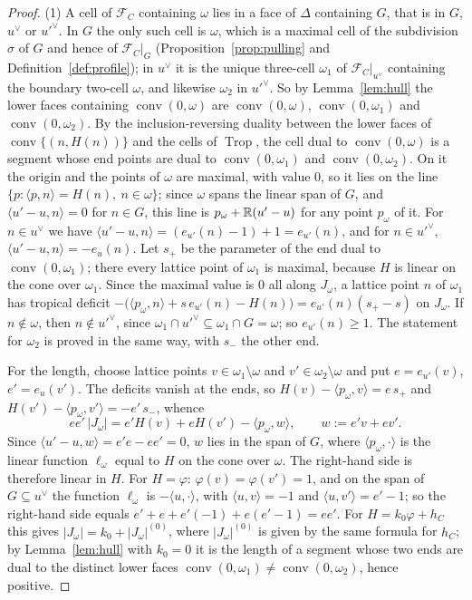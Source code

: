 \begin{proof}
(1) A cell of $\mathcal F_C$ containing $\omega$ lies in a face of $\Delta$ containing $G$, that is in $G$, $u^\vee$ or
$u'^\vee$. In $G$ the only such cell is $\omega$, which is a maximal cell of the subdivision $\sigma$ of $G$ and hence of
$\mathcal F_C|_G$ (Proposition~\ref{prop:pulling} and Definition~\ref{def:profile}); in $u^\vee$ it is the unique three-cell
$\omega_1$ of $\mathcal F_C|_{u^\vee}$ containing the boundary two-cell $\omega$, and likewise $\omega_2$ in $u'^\vee$. So by
Lemma~\ref{lem:hull} the lower faces containing $\operatorname{conv}(0,\omega)$ are $\operatorname{conv}(0,\omega)$,
$\operatorname{conv}(0,\omega_1)$ and $\operatorname{conv}(0,\omega_2)$. By the inclusion-reversing duality between the lower
faces of $\operatorname{conv}\{(n,H(n))\}$ and the cells of $\operatorname{Trop}$, the cell dual to $\operatorname{conv}(0,\omega)$
is a segment whose end points are dual to $\operatorname{conv}(0,\omega_1)$ and $\operatorname{conv}(0,\omega_2)$. On it the
origin and the points of $\omega$ are maximal, with value $0$, so it lies on the line $\{p:\langle p,n\rangle=H(n),\
n\in\omega\}$; since $\omega$ spans the linear span of $G$, and $\langle u'-u,n\rangle=0$ for $n\in G$, this line is
$p_\omega+\mathbb R(u'-u)$ for any point $p_\omega$ of it. For $n\in u^\vee$ we have $\langle u'-u,n\rangle=(e_{u'}(n)-1)+1=e_{u'}(n)$,
and for $n\in u'^\vee$, $\langle u'-u,n\rangle=-e_u(n)$. Let $s_+$ be the parameter of the end dual to
$\operatorname{conv}(0,\omega_1)$; there every lattice point of $\omega_1$ is maximal, because $H$ is linear on the cone over
$\omega_1$. Since the maximal value is $0$ all along $J_\omega$, a lattice point $n$ of $\omega_1$ has tropical deficit
$-\bigl(\langle p_\omega,n\rangle+s\,e_{u'}(n)-H(n)\bigr)=e_{u'}(n)(s_+-s)$ on $J_\omega$. If $n\notin\omega$, then
$n\notin u'^\vee$, since $\omega_1\cap u'^\vee\subseteq\omega_1\cap G=\omega$; so $e_{u'}(n)\ge1$. The statement for $\omega_2$
is proved in the same way, with $s_-$ the other end.

For the length, choose lattice points $v\in\omega_1\setminus\omega$ and $v'\in\omega_2\setminus\omega$ and put
$e=e_{u'}(v)$, $e'=e_u(v')$. The deficits vanish at the ends, so $H(v)-\langle p_\omega,v\rangle=e\,s_+$ and
$H(v')-\langle p_\omega,v'\rangle=-e'\,s_-$, whence
\[
ee'\,|J_\omega|=e'H(v)+eH(v')-\langle p_\omega,w\rangle,\qquad w:=e'v+ev'.
\]
Since $\langle u'-u,w\rangle=e'e-ee'=0$, $w$ lies in the span of $G$, where $\langle p_\omega,\cdot\rangle$ is the linear
function $\ell_\omega$ equal to $H$ on the cone over $\omega$. The right-hand side is therefore linear in $H$. For
$H=\varphi$: $\varphi(v)=\varphi(v')=1$, and on the span of $G\subseteq u^\vee$ the function $\ell_\omega$ is
$-\langle u,\cdot\rangle$, with $\langle u,v\rangle=-1$ and $\langle u,v'\rangle=e'-1$; so the right-hand side equals
$e'+e+e'(-1)+e(e'-1)=ee'$. For $H=k_0\varphi+h_C$ this gives $|J_\omega|=k_0+|J_\omega|^{(0)}$, where $|J_\omega|^{(0)}$ is given
by the same formula for $h_C$; by Lemma~\ref{lem:hull} with $k_0=0$ it is the length of a segment whose two ends are
dual to the distinct lower faces $\operatorname{conv}(0,\omega_1)\neq\operatorname{conv}(0,\omega_2)$, hence positive.


\end{proof}
